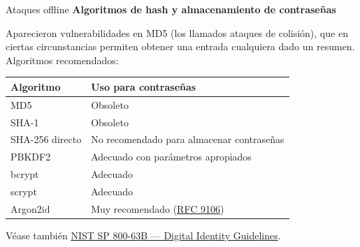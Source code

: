 \documentclass[aspectratio=169,11pt]{beamer}
\newcommand{\lead}[1]{{\bfseries #1}\par\medskip}
\begin{document}
\begin{frame}{Ataques offline}
\small
\lead{Algoritmos de hash y almacenamiento de contraseñas}
Aparecieron vulnerabilidades en MD5 (los llamados ataques de colisión), que en ciertas circunstancias permiten obtener una entrada cualquiera dado un resumen. Algoritmos recomendados:
\begin{center}
\begin{tabular}{ll}
    \toprule
    \textbf{Algoritmo} & \textbf{Uso para contraseñas} \\
    \midrule
    MD5              & Obsoleto \\
    SHA-1            & Obsoleto \\
    SHA-256 directo  & No recomendado para almacenar contraseñas \\
    PBKDF2           & Adecuado con parámetros apropiados \\
    bcrypt           & Adecuado \\
    scrypt           & Adecuado \\
    Argon2id         & Muy recomendado (\href{https://www.rfc-editor.org/rfc/rfc9106.html}{RFC 9106}) \\
    \bottomrule
\end{tabular}
\end{center}
\medskip
Véase también \href{https://pages.nist.gov/800-63-3/sp800-63b.html}{NIST SP 800-63B --- Digital Identity Guidelines}.
\end{frame}
\end{document}
